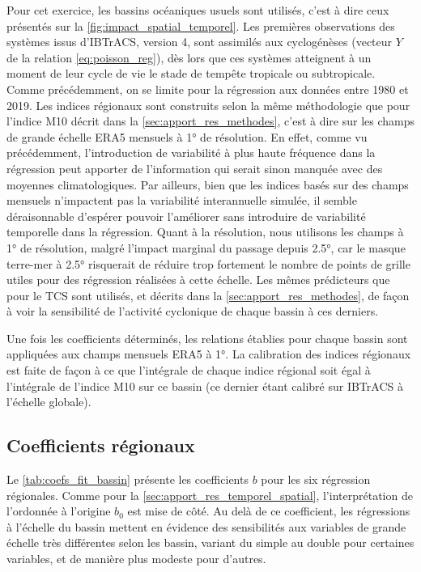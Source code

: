 \documentclass[../main.tex]{subfiles}
\begin{document}
Pour cet exercice, les bassins océaniques usuels sont utilisés, c'est à dire ceux présentés sur la \cref{fig:impact_spatial_temporel}. Les premières
observations des systèmes issus d'IBTrACS, version 4, sont assimilés aux cyclogénèses (vecteur $Y$ de la relation \ref{eq:poisson_reg}), dès lors que ces
systèmes atteignent à un moment de leur cycle de vie le stade de tempête tropicale ou subtropicale. Comme précédemment, on se limite pour la régression aux
données entre \num{1980} et \num{2019}. Les indices régionaux sont construits selon la même méthodologie que pour l'indice M10 décrit dans la
\cref{sec:apport_res_methodes}, c'est à dire sur les champs de grande échelle ERA5 mensuels à \ang{1} de résolution. En effet, comme vu précédemment,
l'introduction de variabilité à plus haute fréquence dans la régression peut apporter de l'information qui serait sinon manquée avec des moyennes
climatologiques. Par ailleurs, bien que les indices basés sur des champs mensuels n'impactent pas la variabilité interannuelle simulée, il semble déraisonnable
d'espérer pouvoir l'améliorer sans introduire de variabilité temporelle dans la régression. Quant à la résolution, nous utilisons les champs à \ang{1} de
résolution, malgré l'impact marginal du passage depuis \ang{2.5}, car le masque terre-mer à \ang{2.5} risquerait de réduire trop fortement le nombre de points
de grille utiles pour des régression réalisées à cette échelle. Les mêmes prédicteurs que pour le TCS sont utilisés, et décrits dans la
\cref{sec:apport_res_methodes}, de façon à voir la sensibilité de l'activité cyclonique de chaque bassin à ces derniers.

Une fois les coefficients déterminés, les relations établies pour chaque bassin sont appliquées aux champs mensuels ERA5 à \ang{1}. La calibration des indices
régionaux est faite de façon à ce que l'intégrale de chaque indice régional soit égal à l'intégrale de l'indice M10 sur ce bassin (ce dernier étant calibré sur
IBTrACS à l'échelle globale).


\subsection{Coefficients régionaux}

Le \cref{tab:coefs_fit_bassin} présente les coefficients $b$ pour les six régression régionales. Comme pour la \cref{sec:apport_res_temporel_spatial},
l'interprétation de l'ordonnée à l'origine $b_0$ est mise de côté. Au delà de ce coefficient, les régressions à l'échelle du bassin mettent en évidence des
sensibilités aux variables de grande échelle très différentes selon les bassin, variant du simple au double pour certaines variables, et de manière plus modeste
pour d'autres.
\end{document}
